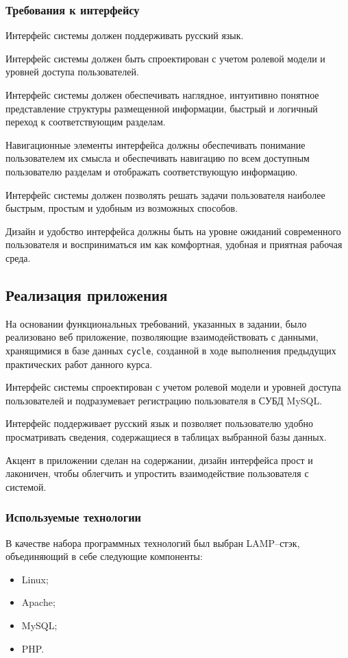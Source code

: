 \documentclass[a4paper,14pt]{extarticle}
\begin{document}
\subsubsection*{Требования к интерфейсу}

Интерфейс системы должен поддерживать русский язык.

Интерфейс системы должен быть спроектирован с учетом ролевой
модели и уровней доступа пользователей.

Интерфейс системы должен обеспечивать наглядное, интуитивно
понятное представление структуры размещенной информации, быстрый и
логичный переход к соответствующим разделам.

Навигационные элементы интерфейса должны обеспечивать понимание
пользователем их смысла и обеспечивать навигацию по всем доступным
пользователю разделам и отображать соответствующую информацию.

Интерфейс системы должен позволять решать задачи пользователя
наиболее быстрым, простым и удобным из возможных способов.

Дизайн и удобство интерфейса должны быть на уровне ожиданий
современного пользователя и восприниматься им как комфортная, удобная и
приятная рабочая среда.

\subsection{Реализация приложения}

На основании функциональных требований, указанных в задании, было реализовано веб приложение, позволяющие взаимодействовать с данными, хранящимися в базе данных \texttt{cycle}, созданной в ходе выполнения предыдущих практических работ данного курса.

Интерфейс системы спроектирован с учетом ролевой
модели и уровней доступа пользователей и подразумевает регистрацию пользователя в СУБД MySQL.

Интерфейс поддерживает русский язык и позволяет пользователю удобно просматривать сведения, содержащиеся в таблицах выбранной базы данных.

Акцент в приложении сделан на содержании, дизайн интерфейса прост и лаконичен, чтобы облегчить и упростить взаимодействие пользователя с системой.

\subsubsection*{Используемые технологии}
В качестве набора программных технологий был выбран LAMP--стэк, объединяющий в себе следующие компоненты:
\begin{itemize}
	\item Linux;
	\item Apache;
	\item MySQL;
	\item PHP.
\end{itemize}
\end{document}
